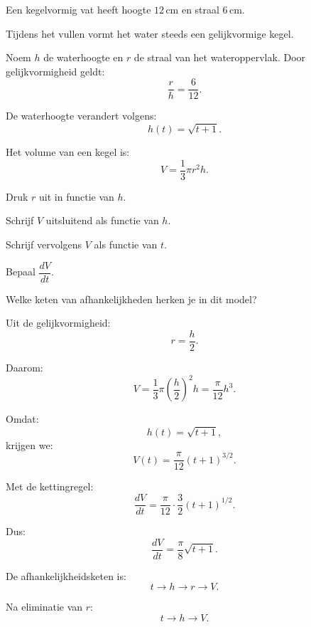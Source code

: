 \documentclass{ximera}
\begin{document}
\begin{oefening}{\oefG}

Een kegelvormig vat heeft hoogte $12\,\mathrm{cm}$ en straal
$6\,\mathrm{cm}$.

Tijdens het vullen vormt het water steeds een gelijkvormige kegel.

Noem $h$ de waterhoogte en $r$ de straal van het wateroppervlak.
Door gelijkvormigheid geldt:
\[
\frac{r}{h}=\frac{6}{12}.
\]

De waterhoogte verandert volgens:
\[
h(t)=\sqrt{t+1}.
\]

Het volume van een kegel is:
\[
V=\frac13\pi r^2h.
\]

\begin{question}
Druk $r$ uit in functie van $h$.
\end{question}

\begin{question}
Schrijf $V$ uitsluitend als functie van $h$.
\end{question}

\begin{question}
Schrijf vervolgens $V$ als functie van $t$.
\end{question}

\begin{question}
Bepaal $\dfrac{dV}{dt}$.
\end{question}

\begin{question}
Welke keten van afhankelijkheden herken je in dit model?
\end{question}

\begin{oplossing}

Uit de gelijkvormigheid:
\[
r=\frac{h}{2}.
\]

Daarom:
\[
V
=
\frac13\pi\left(\frac h2\right)^2h
=
\frac{\pi}{12}h^3.
\]

Omdat:
\[
h(t)=\sqrt{t+1},
\]
krijgen we:
\[
V(t)=\frac{\pi}{12}(t+1)^{3/2}.
\]

Met de kettingregel:
\[
\frac{dV}{dt}
=
\frac{\pi}{12}\cdot\frac32(t+1)^{1/2}.
\]

Dus:
\[
\boxed{\frac{dV}{dt}=\frac{\pi}{8}\sqrt{t+1}.}
\]

De afhankelijkheidsketen is:
\[
t\longrightarrow h\longrightarrow r\longrightarrow V.
\]

Na eliminatie van $r$:
\[
\boxed{t\longrightarrow h\longrightarrow V.}
\]

\end{oplossing}

\end{oefening}
\end{document}
